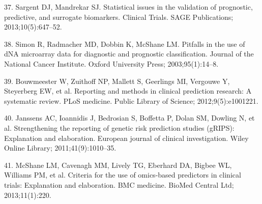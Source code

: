 \documentclass[11pt]{article}
\begin{document}
37. Sargent DJ, Mandrekar SJ. Statistical issues in the validation of
prognostic, predictive, and surrogate biomarkers. Clinical Trials. SAGE
Publications; 2013;10(5):647--52.

38. Simon R, Radmacher MD, Dobbin K, McShane LM. Pitfalls in the use of
dNA microarray data for diagnostic and prognostic classification.
Journal of the National Cancer Institute. Oxford University Press;
2003;95(1):14--8.

39. Bouwmeester W, Zuithoff NP, Mallett S, Geerlings MI, Vergouwe Y,
Steyerberg EW, et al. Reporting and methods in clinical prediction
research: A systematic review. PLoS medicine. Public Library of Science;
2012;9(5):e1001221.

40. Janssens AC, Ioannidis J, Bedrosian S, Boffetta P, Dolan SM, Dowling
N, et al. Strengthening the reporting of genetic risk prediction studies
(gRIPS): Explanation and elaboration. European journal of clinical
investigation. Wiley Online Library; 2011;41(9):1010--35.

41. McShane LM, Cavenagh MM, Lively TG, Eberhard DA, Bigbee WL, Williams
PM, et al. Criteria for the use of omics-based predictors in clinical
trials: Explanation and elaboration. BMC medicine. BioMed Central Ltd;
2013;11(1):220.
\end{document}
